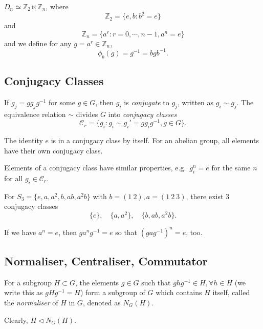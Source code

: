 \documentclass[a4paper,11pt]{article}
\begin{document}
	\begin{ex}
		$D_n \simeq \mathbb{Z}_2 \ltimes \mathbb{Z}_n$, where
		\[
			\mathbb{Z}_2 = \{e, b : b^2 = e\}
		\]
		and
		\[
			\mathbb{Z}_n = \{a^r: r= 0, \cdots, n-1, a^n = e\}
		\]
		and we define for any $g = a^r \in \mathbb{Z}_n$,
		\[
			\phi_b (g) = g^{-1} = b g b^{-1}.
		\]
	\end{ex}

	\subsection{Conjugacy Classes}

	\begin{defi}
		If $g_j = g g_j g^{-1}$ for some $g \in G$, then $g_i$ is \emph{conjugate} to $g_j$, written as $g_i \sim g_j$. The equivalence relation $\sim$ divides $G$ into \emph{conjugacy classes}
		\[
			\mathcal{C}_r = \{g_i: g_i \sim g_i' = g g_i g^{-1}, g \in G\}.
		\]
	\end{defi}

	The identity $e$ is in a conjugacy class by itself. For an abelian group, all elements have their own conjugacy class.

	Elements of a conjugacy class have similar properties, e.g.\ $g_i^n = e$ for the same $n$ for all $g_i \in \mathcal{C}_r$.

	\begin{ex}
		For $S_3 = \{e, a, a^2, b, ab, a^2 b\}$ with $b = (1\ 2), a = (1\ 2\ 3)$, there exist 3 conjugacy classes
		\[
			\{e\}, \quad \{a, a^2\}, \quad \{b, ab, a^2 b\}.
		\]
		
	\end{ex}

	\begin{nt}
		If we have $a ^{n} = e$, then $g a^n g^{-1} = e$ so that $(g a g^{-1})^n = e$, too. 
	\end{nt}

	\subsection{Normaliser, Centraliser, Commutator}

	\begin{defi}
		For a subgroup $H \subset G$, the elements $g \in G$ such that $g h g^{-1} \in H, \forall h \in H$ (we write this as $gHg^{-1} = H$) form a subgroup of $G$ which contains $H$ itself, called the \emph{normaliser} of $H$ in $G$, denoted as $N_G(H)$.
	\end{defi}
	\begin{cor}
		Clearly, $H \triangleleft N_G(H)$.
	\end{cor}
\end{document}
